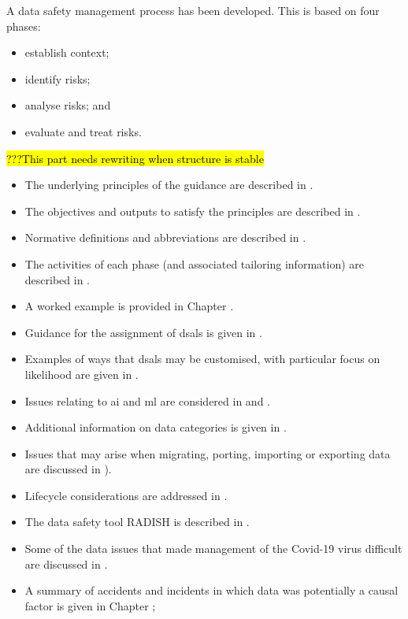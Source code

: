 A data safety management process has been developed. This is based on four phases:
\begin{itemize}
	\item establish context;
	\item identify risks;
	\item analyse risks; and
	\item evaluate and \gls{treat} risks.
\end{itemize}
\hl{???This part needs rewriting when structure is stable}
\cbstart
\begin{itemize}
	\item The underlying principles of the guidance are described in .
	\item The objectives and outputs to satisfy the principles are described in .
	\item Normative definitions and abbreviations are described in .
	\item The activities of each phase (and associated \gls{tailoring} \gls{information}) are described in .
	\item A worked example is provided in Chapter .
	\item Guidance for the assignment of \glspl{dsal} is given in .
	\item Examples of ways that \glspl{dsal} may be customised, with particular focus on likelihood are given in .
	\item Issues relating to \gls{ai} and \gls{ml} are considered in  and .
	\item Additional information on data categories is given in .
	\item Issues that may arise when migrating, porting, importing or exporting data are discussed in ).            
	\item Lifecycle considerations are addressed in .
	\item The data safety tool RADISH is described in .
	\item Some of the data issues that made management of the Covid-19 virus difficult are discussed in .
	\item A summary of accidents and incidents in which data was potentially a causal factor is given in Chapter ;
	\cbend
\end{itemize}
